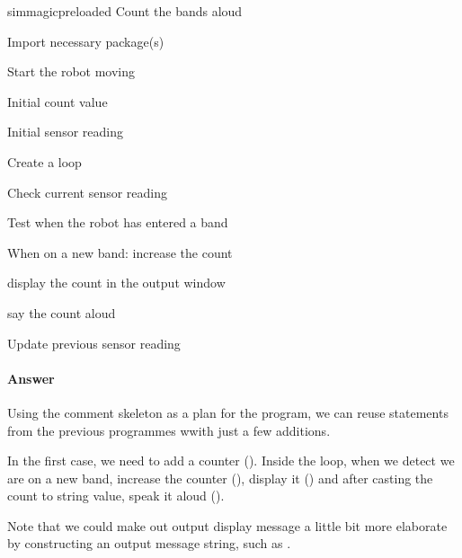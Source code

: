 \documentclass[letterpaper,10pt,english]{sphinxmanual}
\begin{document}
{
\begin{sphinxVerbatim}[commandchars=\\\{\}]
\llap{\color{nbsphinxin}[ ]:\,\hspace{\fboxrule}\hspace{\fboxsep}}\PYGZpc{}\PYGZpc{}sim\PYGZus{}magic\PYGZus{}preloaded
\PYGZsh{} Count the bands aloud

\PYGZsh{} Import necessary package(s)


\PYGZsh{} Start the robot moving

\PYGZsh{} Initial count value

\PYGZsh{} Initial sensor reading

\PYGZsh{} Create a loop

    \PYGZsh{} Check current sensor reading

    \PYGZsh{} Test when the robot has entered a band

        \PYGZsh{} When on a new band:
        \PYGZsh{} \PYGZhy{} increase the count

        \PYGZsh{} \PYGZhy{} display the count in the output window

        \PYGZsh{} \PYGZhy{} say the count aloud

    \PYGZsh{} Update previous sensor reading
\end{sphinxVerbatim}
}


\paragraph{Answer}
\label{\detokenize{content/00_SOFTWARE_GUIDE/Section_00_03_quick_practical_tour:id4}}

Using the comment skeleton as a plan for the program, we can reuse statements from the previous programmes wwith just a few additions.

In the first case, we need to add a counter (). Inside the loop, when we detect we are on a new band, increase the counter (), display it () and after casting the count to string value, speak it aloud ().

Note that we could make out output display message a little bit more elaborate by constructing an output message string, such as . 
\end{document}

